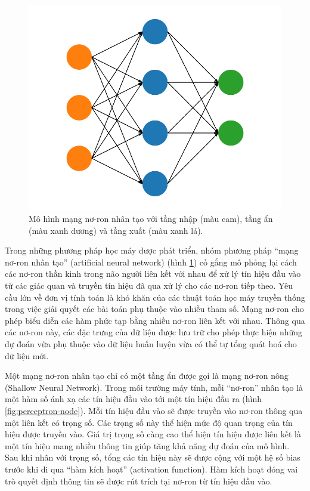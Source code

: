 \begin{figure}[htp]
	\centering
	\includegraphics[width=90 mm]{images/ann.png}
	\caption{Mô hình mạng nơ-ron nhân tạo với tầng nhập (màu cam), tầng ẩn (màu xanh dương) và tầng xuất (màu xanh lá).}
	\label{fig:ann}
\end{figure}

Trong những phương pháp học máy được phát triển, nhóm phương pháp ``mạng nơ-ron nhân tạo'' (artificial neural network) (hình \ref{fig:ann}) cố gắng mô phỏng lại cách các nơ-ron thần kinh trong não người liên kết với nhau để xử lý tín hiệu đầu vào từ các giác quan và truyền tín hiệu đã qua xử lý cho các nơ-ron tiếp theo. Yêu cầu lớn về đơn vị tính toán là khó khăn của các thuật toán học máy truyền thống trong việc giải quyết các bài toán phụ thuộc vào nhiều tham số. Mạng nơ-ron cho phép biểu diễn các hàm phức tạp bằng nhiều nơ-ron liên kết với nhau. Thông qua các nơ-ron này, các đặc trưng của dữ liệu được lưu trữ cho phép thực hiện những dự đoán vừa phụ thuộc vào dữ liệu huấn luyện vừa có thể tự tổng quát hoá cho dữ liệu mới.

Một mạng nơ-ron nhân tạo chỉ có một tầng ẩn được gọi là mạng nơ-ron nông (Shallow Neural Network). Trong môi trường máy tính, mỗi ``nơ-ron'' nhân tạo là một hàm số ánh xạ các tín hiệu đầu vào tới một tín hiệu đầu ra (hình \ref{fig:perceptron-node}). Mỗi tín hiệu đầu vào sẽ được truyền vào nơ-ron thông qua một liên kết có trọng số. Các trọng số này thể hiện mức độ quan trọng của tín hiệu được truyền vào. Giá trị trọng số càng cao thể hiện tín hiệu được liên kết là một tín hiệu mang nhiều thông tin giúp tăng khả năng dự đoán của mô hình. Sau khi nhân với trọng số, tổng các tín hiệu này sẽ được cộng với một hệ số bias trước khi đi qua ``hàm kích hoạt'' (activation function). Hàm kích hoạt đóng vai trò quyết định thông tin sẽ được rút trích tại nơ-ron từ tín hiệu đầu vào.


